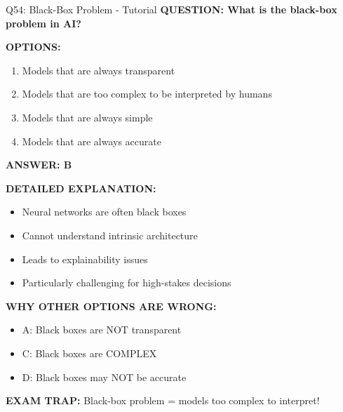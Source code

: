 \documentclass[8pt]{beamer}
\begin{document}
	\begin{frame}{Q54: Black-Box Problem - Tutorial}
		\fontsize{6.5}{7.5}\selectfont
		\textbf{QUESTION: What is the black-box problem in AI?}
		
		\vspace{0.1cm}
		\textbf{OPTIONS:}
		\begin{enumerate}
			\item Models that are always transparent
			\item Models that are too complex to be interpreted by humans
			\item Models that are always simple
			\item Models that are always accurate
		\end{enumerate}
		
		\vspace{0.1cm}
		\textcolor{myblue}{\textbf{ANSWER: B}}
		
		\vspace{0.1cm}
		\textbf{DETAILED EXPLANATION:}
		\begin{itemize}
			\item Neural networks are often black boxes
			\item Cannot understand intrinsic architecture
			\item Leads to explainability issues
			\item Particularly challenging for high-stakes decisions
		\end{itemize}
		
		\vspace{0.1cm}
		\textcolor{myred}{\textbf{WHY OTHER OPTIONS ARE WRONG:}}
		\begin{itemize}
			\item \textcolor{myred}{A:} Black boxes are NOT transparent
			\item \textcolor{myred}{C:} Black boxes are COMPLEX
			\item \textcolor{myred}{D:} Black boxes may NOT be accurate
		\end{itemize}
		
		\textcolor{myred}{\textbf{EXAM TRAP:}} Black-box problem = \textcolor{myblue}{models too complex to interpret}!
	\end{frame}
	
\end{document}
